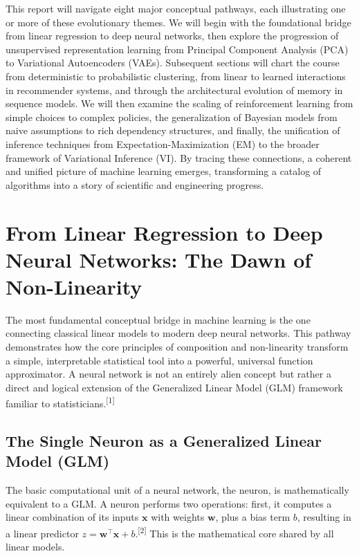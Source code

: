 \documentclass[11pt]{article}
\newcommand{\refnum}[1]{\textsuperscript{[#1]}}
\begin{document}
This report will navigate eight major conceptual pathways, each illustrating one or more of these evolutionary themes. We will begin with the foundational bridge from linear regression to deep neural networks, then explore the progression of unsupervised representation learning from Principal Component Analysis (PCA) to Variational Autoencoders (VAEs). Subsequent sections will chart the course from deterministic to probabilistic clustering, from linear to learned interactions in recommender systems, and through the architectural evolution of memory in sequence models. We will then examine the scaling of reinforcement learning from simple choices to complex policies, the generalization of Bayesian models from naive assumptions to rich dependency structures, and finally, the unification of inference techniques from Expectation-Maximization (EM) to the broader framework of Variational Inference (VI). By tracing these connections, a coherent and unified picture of machine learning emerges, transforming a catalog of algorithms into a story of scientific and engineering progress.

\section{From Linear Regression to Deep Neural Networks: The Dawn of Non-Linearity}

The most fundamental conceptual bridge in machine learning is the one connecting classical linear models to modern deep neural networks. This pathway demonstrates how the core principles of composition and non-linearity transform a simple, interpretable statistical tool into a powerful, universal function approximator. A neural network is not an entirely alien concept but rather a direct and logical extension of the Generalized Linear Model (GLM) framework familiar to statisticians.\refnum{1}

\subsection{The Single Neuron as a Generalized Linear Model (GLM)}
The basic computational unit of a neural network, the neuron, is mathematically equivalent to a GLM. A neuron performs two operations: first, it computes a linear combination of its inputs $\mathbf{x}$ with weights $\mathbf{w}$, plus a bias term $b$, resulting in a linear predictor $z=\mathbf{w}^\top\mathbf{x}+b$.\refnum{2} This is the mathematical core shared by all linear models.
\end{document}
